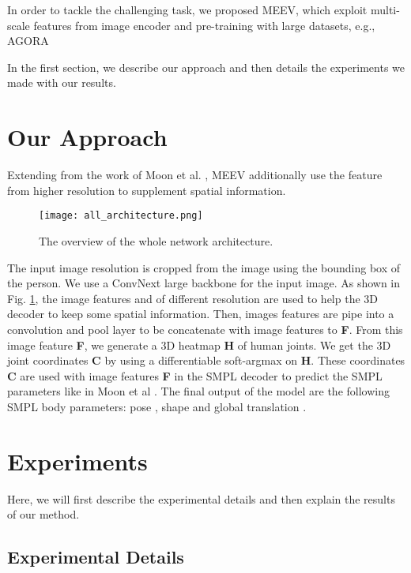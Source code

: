 \documentclass[runningheads]{llncs}
\begin{document}
In order to tackle the challenging task, we proposed MEEV, which exploit multi-scale features from image encoder and pre-training with large datasets, e.g., AGORA \cite{Patel:CVPR:2021} 


In the first section, we describe our approach and then details the experiments we made with our results.



\section{Our Approach}
Extending from the work of Moon et al. \cite{Moon_2022_CVPRW_Hand4Whole}, MEEV additionally use the feature from higher resolution to supplement spatial information. 

\begin{figure}[h]
    \centering
    \texttt{[image: all\_architecture.png]}
    \caption{The overview of the whole network architecture.}
    \label{fig:main_model}
\end{figure}

The input image resolution  is cropped from the image using the bounding box of the person.
We use a ConvNext \cite{liu2022convnet} large backbone for the input image.
As shown in Fig. \ref{fig:main_model}, the image features  and 
 of different resolution are used to help the 3D decoder to keep some spatial information. Then, 
 images features are pipe into a convolution and pool layer to be concatenate with  image features to \textbf{F}.
From this image feature \textbf{F}, we generate a 3D heatmap \textbf{H} of human joints. We get the 3D joint coordinates \textbf{C} by using a differentiable soft-argmax on \textbf{H}. 
These coordinates \textbf{C} are used with image features \textbf{F} in the SMPL decoder to predict the SMPL parameters like in Moon et al \cite{Moon_2022_CVPRW_Hand4Whole}.
The final output of the model are the following SMPL \cite{SMPL:2015} body parameters: pose 
, shape  and global translation  .


\section{Experiments}
Here, we will first describe the experimental details and then explain the results of our method.

\subsection{Experimental Details}
\end{document}
